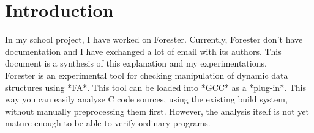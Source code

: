 \section {Introduction}

In my school project, I have worked on Forester. Currently, Forester don't have documentation and I have exchanged a lot of email with its authors. This document is a synthesis of this explanation and my experimentations.
\\

Forester is an experimental tool for checking manipulation of dynamic data
structures using *\gls{FA}*. This tool can be loaded into *GCC* as a *plug-in*.  This
way you can easily analyse C code sources, using the existing build system,
without manually preprocessing them first. However, the analysis itself is not yet mature enough to be able to verify ordinary programs.